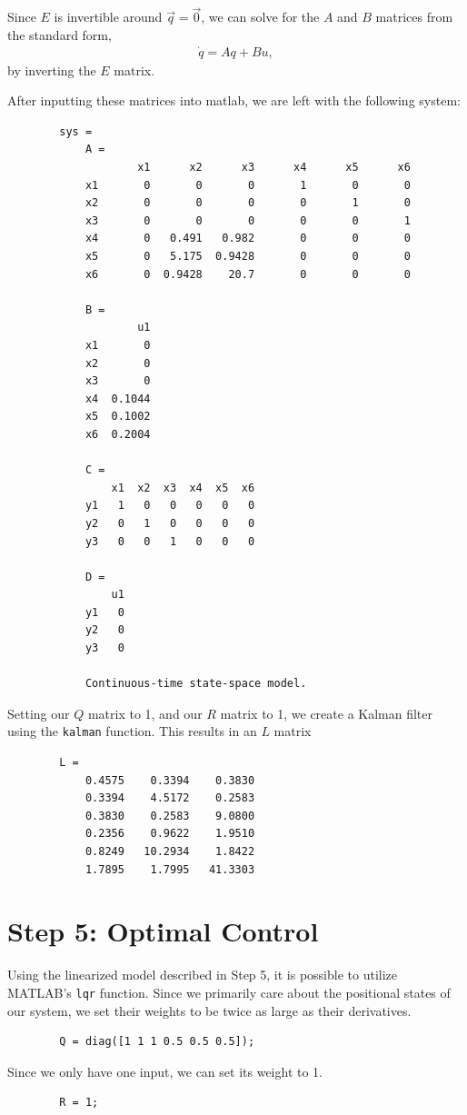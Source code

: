 \documentclass{article}
\theoremstyle{definition}
\begin{document}
    Since $E$ is invertible around $\vec q = \vec 0$, we can solve for 
    the $A$ and $B$ matrices from the standard form,
    \begin{eqnarray*}
        \dot q = A q + B u,
    \end{eqnarray*}
    by inverting the $E$ matrix. 

    After inputting these matrices into matlab, we are left with the following system:
    \begin{verbatim}
        sys =
            A = 
                    x1      x2      x3      x4      x5      x6
            x1       0       0       0       1       0       0
            x2       0       0       0       0       1       0
            x3       0       0       0       0       0       1
            x4       0   0.491   0.982       0       0       0
            x5       0   5.175  0.9428       0       0       0
            x6       0  0.9428    20.7       0       0       0
            
            B = 
                    u1
            x1       0
            x2       0
            x3       0
            x4  0.1044
            x5  0.1002
            x6  0.2004
            
            C = 
                x1  x2  x3  x4  x5  x6
            y1   1   0   0   0   0   0
            y2   0   1   0   0   0   0
            y3   0   0   1   0   0   0
            
            D = 
                u1
            y1   0
            y2   0
            y3   0
            
            Continuous-time state-space model.
    \end{verbatim}
    Setting our $Q$ matrix to 1, and our $R$ matrix to 1,
    we create a Kalman filter using the \texttt{kalman} function.
    This results in an $L$ matrix 
    \begin{verbatim}
        L =
            0.4575    0.3394    0.3830
            0.3394    4.5172    0.2583
            0.3830    0.2583    9.0800
            0.2356    0.9622    1.9510
            0.8249   10.2934    1.8422
            1.7895    1.7995   41.3303
    \end{verbatim}

    \section*{Step 5: Optimal Control}
    Using the linearized model described in Step 5, it is possible
    to utilize MATLAB's \texttt{lqr} function.
    Since we primarily care about the positional states of our system,
    we set their weights to be twice as large as their derivatives.
    \begin{verbatim}
        Q = diag([1 1 1 0.5 0.5 0.5]);
    \end{verbatim}
    Since we only have one input, we can set its weight to 1.
    \begin{verbatim}
        R = 1;
    \end{verbatim}
\end{document}
